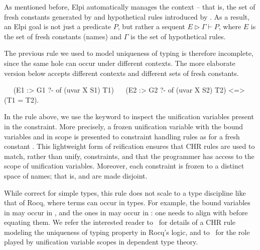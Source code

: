 \documentclass{these-ISSS}
\newenvironment{chrcode}
  {\VerbatimEnvironment\begin{chrbox}\begin{xelpicode}}{\end{xelpicode}
  \end{chrbox}}
\begin{document}
As mentioned before, Elpi automatically manages the context -- that is, the set
of fresh constants generated by  and hypothetical rules introduced by
\elpi{=>}. As a result, an Elpi goal is not just a predicate $P$, but rather a
sequent $E \triangleright  \Gamma \vdash P$, where $E$ is the set of fresh
constants (names) and $\Gamma$ is the set of hypothetical rules.

The previous rule we used to model uniqueness of typing is therefore incomplete,
since the same hole can occur under different contexts. The more elaborate
version below accepts different contexts and different sets of fresh constants.


\begin{chrcode}
~~ (E1 :> G1 ?- of (uvar X S1) T1)
   ~~ (E2 :> G2 ?- of (uvar X S2) T2)
 <=> (T1 = T2).
\end{chrcode}

\noindent
In the rule above, we use the keyword  to inspect the unification
variables present in the constraint. More precisely, a frozen unification variable
 with the bound variables  and  in scope is presented
to constraint handling rules as  for a fresh constant
. This lightweight form of
reification ensures that CHR rules are used to match, rather than unify,
constraints, and that the programmer has access to the scope of unification
variables. Moreover, each constraint is frozen to a distinct space of names;
that is,  and  are made disjoint.


While correct for simple types, this rule does not scale to a type
discipline like that of Rocq, where terms can occur in types. For example,
the bound variables in  may occur in , and the
ones in  may occur in : one needs to align 
with  before equating them.
We refer the interested reader to~\cite{TASSI_2019} for details of a CHR rule modeling
the uniqueness of typing property in Rocq's logic, and to~\cite{Jojgov} for
the role played by unification variable scopes in dependent type theory.


\end{document}
